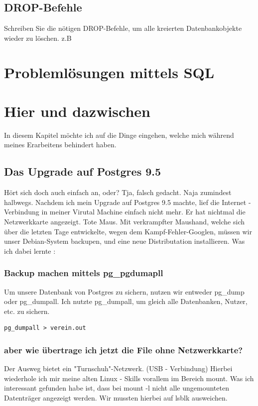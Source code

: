 \subsection{DROP-Befehle}
Schreiben Sie die nötigen DROP-Befehle, um alle kreierten Datenbankobjekte wieder zu löschen.
z.B

\clearpage

\section{Problemlösungen mittels SQL}


\section{Hier und dazwischen}
In diesem Kapitel möchte ich auf die Dinge eingehen, welche mich während meines Erarbeitens behindert haben.

\subsection{Das Upgrade auf Postgres 9.5}
Hört sich doch auch einfach an, oder?
Tja, falsch gedacht.
Naja zumindest halbwegs.
Nachdem ich mein Upgrade auf Postgres 9.5 machte, lief die Internet - Verbindung in meiner Virutal Machine einfach nicht mehr.
Er hat nichtmal die Netzwerkkarte angezeigt. Tote Maus.
Mit verkrampfter Maushand, welche sich über die letzten Tage entwickelte, wegen dem Kampf-Fehler-Googlen, müssen wir unser Debian-System backupen, und eine neue Distributation installieren.
Was ich dabei lernte :
\subsubsection{Backup machen mittels pg\_pgdumapll}
Um unsere Datenbank von Postgres zu sichern, nutzen wir entweder pg\_dump oder pg\_dumpall.
Ich nutzte pg\_dumpall, um gleich alle Datenbanken, Nutzer, etc. zu sichern.
\lstset{language=bash}
\begin{lstlisting}
pg_dumpall > verein.out
\end{lstlisting}
\subsubsection{aber wie übertrage ich jetzt die File ohne Netzwerkkarte?}
Der Ausweg bietet ein "Turnschuh"-Netzwerk. (USB - Verbindung)
Hierbei wiederhole ich mir meine alten Linux - Skills vorallem im Bereich mount.
Was ich interessant gefunden habe ist, dass bei mount -l nicht alle ungemounteten Datenträger angezeigt werden.
Wir mussten hierbei auf lsblk ausweichen.

